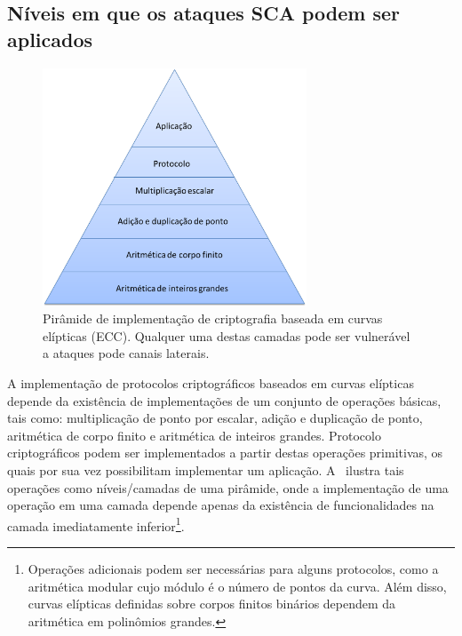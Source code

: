 \subsection{Níveis em que os ataques SCA podem ser aplicados}


\begin{figure}[h!tb]
	\centering   %
	\includegraphics[width=0.7\textwidth]{figures/piramide_ECC.png}
	\caption{
		Pirâmide de implementação de criptografia baseada em curvas elípticas (ECC). Qualquer uma destas camadas pode ser vulnerável a ataques pode canais laterais.
	}
	\label{fig:pyramid-ecc}
\end{figure}

A implementação de protocolos criptográficos baseados em curvas elípticas depende da existência de implementações de um conjunto de operações básicas, tais como: multiplicação de ponto por escalar, adição e duplicação de ponto, aritmética de corpo finito e aritmética de inteiros grandes. Protocolo criptográficos podem ser implementados a partir destas operações primitivas, os quais por sua vez possibilitam implementar um aplicação. A~ ilustra tais operações como níveis/camadas de uma pirâmide, onde a implementação de uma operação em uma camada depende apenas da existência de funcionalidades na camada imediatamente inferior\footnote{Operações adicionais podem ser necessárias para alguns protocolos, como a aritmética modular cujo módulo é o número de pontos da curva. Além disso, curvas elípticas definidas sobre corpos finitos binários dependem da aritmética em polinômios grandes.}.

